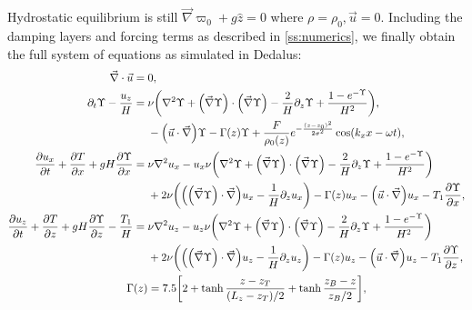 \documentclass[twocolumn,
        nofootinbib, %
        usenames, %
        aps,
        prd,
        dvipsnames %
    ]{revtex4-1}%
\newcommand*{\pd}[2]{\frac{\partial#1}{\partial#2}}
\DeclarePairedDelimiter\p{\lparen}{\rparen}
\DeclarePairedDelimiter\s{\lbrack}{\rbrack}
\begin{document}
Hydrostatic equilibrium is still $\vec{\nabla} \varpi_0 + g\hat{z} = 0$ where
$\rho = \rho_0, \vec{u} = 0$. Including the damping layers and forcing terms as
described in \autoref{ss:numerics}, we finally obtain the full system of
equations as simulated in Dedalus:
\begin{subequations}
    \begin{align}
        \vec{\nabla} \cdot \vec{u} ={}& 0,\\
        \partial_t \Upsilon - \frac{u_z}{H}
            ={}& \nu\p*{\nabla^2 \Upsilon + \p*{\vec{\nabla}
            \Upsilon} \cdot \p*{\vec{\nabla}\Upsilon} - \frac{2}{H}\partial_z
            \Upsilon + \frac{1 - e^{-\Upsilon}}{H^2}},\nonumber\\
            & - \p*{\vec{u} \cdot \vec{\nabla}}\Upsilon
                -\Gamma(z) \Upsilon
                + \frac{F}{\rho_0(z)}e^{-\frac{(z - z_0)^2}{2\sigma^2}}
                    \cos \p*{k_xx - \omega t},\\
        \pd{u_x}{t} + \pd{T}{x} + gH\pd{\Upsilon}{x} ={}&
            \nu \nabla^2 u_x
            - u_x \nu\p*{\nabla^2 \Upsilon + \p*{\vec{\nabla} \Upsilon} \cdot
                \p*{\vec{\nabla}\Upsilon} - \frac{2}{H}\partial_z \Upsilon
                + \frac{1 - e^{-\Upsilon}}{H^2}}\nonumber\\
            &+ 2\nu \p*{\p*{\p*{\vec{\nabla}\Upsilon} \cdot \vec{\nabla}}u_x
                - \frac{1}{H}\partial_z u_x}
            -\Gamma(z) u_x
                - \p*{\vec{u} \cdot \vec{\nabla}}u_x
                - T_1 \pd{\Upsilon}{x},\\
        \pd{u_z}{t} + \pd{T}{z} + gH\pd{\Upsilon}{z} - \frac{T_1}{H} ={}&
            \nu \nabla^2 u_z
            - u_z \nu\p*{\nabla^2 \Upsilon + \p*{\vec{\nabla} \Upsilon} \cdot
                \p*{\vec{\nabla}\Upsilon} - \frac{2}{H}\partial_z \Upsilon
                + \frac{1 - e^{-\Upsilon}}{H^2}}\nonumber\\
            &+ 2\nu \p*{\p*{\p*{\vec{\nabla}\Upsilon} \cdot \vec{\nabla}}u_z -
                \frac{1}{H}\partial_z u_{z}}
            -\Gamma(z) u_z - \p*{\vec{u} \cdot \vec{\nabla}}u_z
            - T_1 \pd{\Upsilon}{z},\\
        \Gamma(z) &= 7.5\s*{2 + \tanh \frac{z - z_T}{(L_z - z_T) / 2}
            + \tanh \frac{z_B - z}{z_B / 2}},\label{eq:Gamma}
    \end{align}
\end{subequations}


\end{document}
